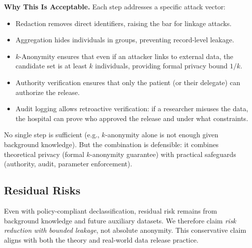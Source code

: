 \textbf{Why This Is Acceptable.} Each step addresses a specific attack vector:
\begin{itemize}
    \item Redaction removes direct identifiers, raising the bar for linkage attacks.
    \item Aggregation hides individuals in groups, preventing record-level leakage.
    \item $k$-Anonymity ensures that even if an attacker links to external data, the candidate set is at least $k$ individuals, providing formal privacy bound $1/k$.
    \item Authority verification ensures that only the patient (or their delegate) can authorize the release.
    \item Audit logging allows retroactive verification: if a researcher misuses the data, the hospital can prove who approved the release and under what constraints.
\end{itemize}

No single step is sufficient (e.g., $k$-anonymity alone is not enough given background knowledge). But the combination is defensible: it combines theoretical privacy (formal $k$-anonymity guarantee) with practical safeguards (authority, audit, parameter enforcement).

\subsection{Residual Risks}

Even with policy-compliant declassification, residual risk remains from background knowledge and future auxiliary datasets. We therefore claim \emph{risk reduction with bounded leakage}, not absolute anonymity. This conservative claim aligns with both the theory and real-world data release practice.


